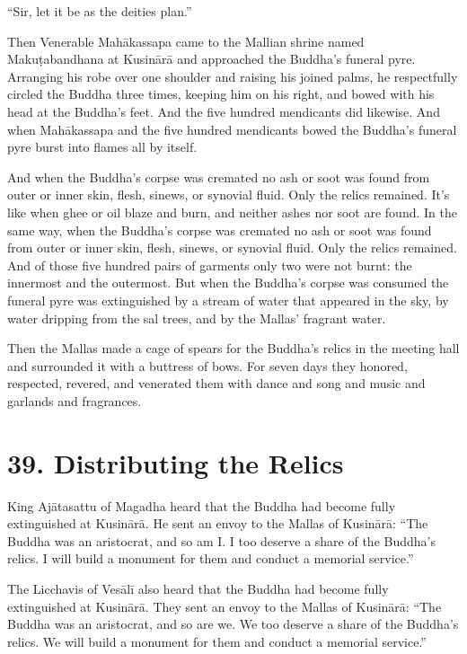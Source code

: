 \documentclass[12pt,openany]{book}%
\begin{document}
“Sir, let it be as the deities plan.” 

Then Venerable \textsanskrit{Mahākassapa} came to the Mallian shrine named \textsanskrit{Makuṭabandhana} at \textsanskrit{Kusinārā} and approached the Buddha’s funeral pyre. Arranging his robe over one shoulder and raising his joined palms, he respectfully circled the Buddha three times, keeping him on his right, and bowed with his head at the Buddha’s feet. And the five hundred mendicants did likewise. And when \textsanskrit{Mahākassapa} and the five hundred mendicants bowed the Buddha’s funeral pyre burst into flames all by itself. 

And when the Buddha’s corpse was cremated no ash or soot was found from outer or inner skin, flesh, sinews, or synovial fluid. Only the relics remained. It’s like when ghee or oil blaze and burn, and neither ashes nor soot are found. In the same way, when the Buddha’s corpse was cremated no ash or soot was found from outer or inner skin, flesh, sinews, or synovial fluid. Only the relics remained. And of those five hundred pairs of garments only two were not burnt: the innermost and the outermost. But when the Buddha’s corpse was consumed the funeral pyre was extinguished by a stream of water that appeared in the sky, by water dripping from the sal trees, and by the Mallas’ fragrant water. 

Then the Mallas made a cage of spears for the Buddha’s relics in the meeting hall and surrounded it with a buttress of bows. For seven days they honored, respected, revered, and venerated them with dance and song and music and garlands and fragrances. 

\section*{39. Distributing the Relics }

King \textsanskrit{Ajātasattu} of Magadha heard that the Buddha had become fully extinguished at \textsanskrit{Kusinārā}. He sent an envoy to the Mallas of \textsanskrit{Kusinārā}: “The Buddha was an aristocrat, and so am I. I too deserve a share of the Buddha’s relics. I will build a monument for them and conduct a memorial service.” 

The Licchavis of \textsanskrit{Vesālī} also heard that the Buddha had become fully extinguished at \textsanskrit{Kusinārā}. They sent an envoy to the Mallas of \textsanskrit{Kusinārā}: “The Buddha was an aristocrat, and so are we. We too deserve a share of the Buddha’s relics. We will build a monument for them and conduct a memorial service.” 
\end{document}
